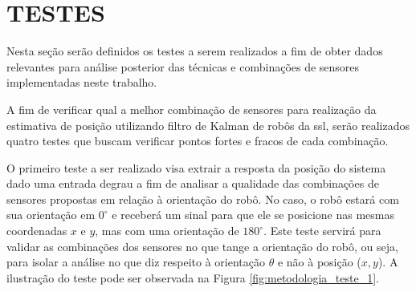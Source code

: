\documentclass[acronym, symbols, table]{fei}
\begin{document}
	\section{TESTES}\label{sec:metodologia_testes}
	
		Nesta seção serão definidos os testes a serem realizados a fim de obter dados relevantes para análise posterior das técnicas e combinações de sensores implementadas neste trabalho.
		
		A fim de verificar qual a melhor combinação de sensores para realização da estimativa de posição utilizando filtro de Kalman de robôs da \acrshort{ssl}, serão realizados quatro testes que buscam verificar pontos fortes e fracos de cada combinação.
		
		O primeiro teste a ser realizado visa extrair a resposta da posição do sistema dado uma entrada degrau a fim de analisar a qualidade das combinações de sensores propostas em relação à orientação do robô. No caso, o robô estará com sua orientação em $0^\circ$ e receberá um sinal para que ele se posicione nas mesmas coordenadas $x$ e $y$, mas com uma orientação de $180^\circ$. Este teste servirá para validar as combinações dos sensores no que tange a orientação do robô, ou seja, para isolar a análise no que diz respeito à orientação $\theta$ e não à posição ($x, y$). A ilustração do teste pode ser observada na Figura \ref{fig:metodologia_teste_1}.
		
\end{document}

